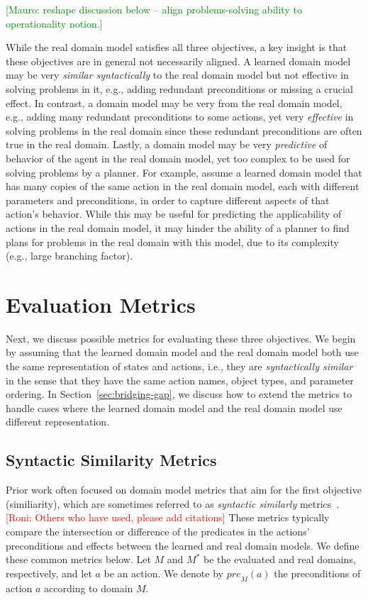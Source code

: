 \documentclass{article}
\theoremstyle{definition}
\theoremstyle{remark}
\newcommand{\realm}{\ensuremath{M^*}\xspace}
\newcommand{\pre}{\ensuremath{\textit{pre}}\xspace}
\newcommand{\roni}[1]{{\textcolor{red}{[Roni: #1]}}}
\newcommand{\mauro}[1]{{\textcolor{green}{[Mauro: #1]}}}
\begin{document}
\mauro{reshape discussion below -- align problems-solving ability to operationality notion.}

While the real domain model satisfies all three objectives, 
a key insight is that these objectives are in general not necessarily aligned. 
A learned domain model may be very \emph{similar syntactically} to the real domain model but not effective in solving problems in it, 
e.g., adding redundant preconditions or missing a crucial effect. 
In contrast, a domain model may be very from the real domain model, e.g., adding many redundant preconditions to some actions, yet very \emph{effective} in solving problems in the real domain since these redundant preconditions are often true in the real domain. 
Lastly, a domain model may be very \emph{predictive} of behavior of the agent in the real domain model, yet too complex to be used for solving problems by a planner. 
For example, assume a learned domain model that has many copies of the same action in the real domain model, each with different parameters and preconditions, in order to capture different aspects of that action's behavior. 
While this may be useful for predicting the applicability of actions in the real domain model, 
it may hinder the ability of a planner to find plans for problems in the real domain with this model, due to its complexity (e.g., large branching factor). 

\section{Evaluation Metrics}
Next, we discuss possible metrics for evaluating these three objectives. 
We begin by assuming that the learned domain model and the real domain model both use the same representation of states and actions, i.e., they are \emph{syntactically similar} in the sense that they have the same action names, object types, and parameter ordering.
In Section~\ref{sec:bridging-gap}, we discuss how to extend the metrics to handle cases where the learned domain model and the real domain model use different representation. 


\subsection{Syntactic Similarity Metrics}
Prior work often focused on domain model metrics that aim for the first objective (similiarity), which are sometimes referred to as \emph{syntactic similarly} metrics~\citep{aineto2019learning,mordoch2023safe,xi2024neuro}.\roni{Others who have used, please add citations}
These metrics typically compare the intersection or difference of the predicates in the actions' preconditions and effects between the learned and real domain models. We define these common metrics below. 
Let $M$ and $\realm$ be the evaluated and real domains, respectively, and let $a$ be an action. We denote by $\pre_M(a)$ the preconditions of action $a$ according to domain $M$.
\end{document}
